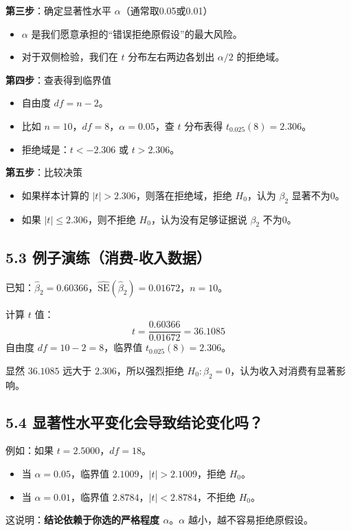 \documentclass[12pt,a4paper]{ctexart}
\begin{document}
\textbf{第三步}：确定显著性水平 \(\alpha\)（通常取0.05或0.01）
\begin{itemize}
    \item \(\alpha\) 是我们愿意承担的“错误拒绝原假设”的最大风险。
    \item 对于双侧检验，我们在 \(t\) 分布左右两边各划出 \(\alpha/2\) 的拒绝域。
\end{itemize}

\textbf{第四步}：查表得到临界值
\begin{itemize}
    \item 自由度 \(df = n-2\)。
    \item 比如 \(n=10\)，\(df=8\)，\(\alpha=0.05\)，查 \(t\) 分布表得 \(t_{0.025}(8) = 2.306\)。
    \item 拒绝域是：\(t < -2.306\) 或 \(t > 2.306\)。
\end{itemize}

\textbf{第五步}：比较决策
\begin{itemize}
    \item 如果样本计算的 \(|t| > 2.306\)，则落在拒绝域，拒绝 \(H_0\)，认为 \(\beta_2\) 显著不为0。
    \item 如果 \(|t| \le 2.306\)，则不拒绝 \(H_0\)，认为没有足够证据说 \(\beta_2\) 不为0。
\end{itemize}

\subsection*{5.3 例子演练（消费-收入数据）}
已知：\(\hat{\beta}_2 = 0.60366\)，\(\widehat{\text{SE}}(\hat{\beta}_2) = 0.01672\)，\(n=10\)。

计算 \(t\) 值：
\[
t = \frac{0.60366}{0.01672} = 36.1085
\]
自由度 \(df = 10 - 2 = 8\)，临界值 \(t_{0.025}(8) = 2.306\)。

显然 \(36.1085\) 远大于 \(2.306\)，所以强烈拒绝 \(H_0: \beta_2 = 0\)，认为收入对消费有显著影响。

\subsection*{5.4 显著性水平变化会导致结论变化吗？}
例如：如果 \(t=2.5000\)，\(df=18\)。
\begin{itemize}
    \item 当 \(\alpha=0.05\)，临界值 \(2.1009\)，\(|t|>2.1009\)，拒绝 \(H_0\)。
    \item 当 \(\alpha=0.01\)，临界值 \(2.8784\)，\(|t|<2.8784\)，不拒绝 \(H_0\)。
\end{itemize}
这说明：\textbf{结论依赖于你选的严格程度 \(\alpha\)}。\(\alpha\) 越小，越不容易拒绝原假设。
\end{document}
